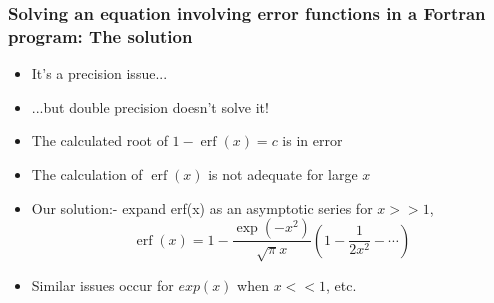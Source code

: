 \documentclass{beamer}
\DeclareMathOperator{\erf}{erf}
\begin{document}
\begin{frame}
\frametitle{Solving an equation involving error functions in a Fortran program:
The solution}
\begin{itemize}
\item It's a precision issue...
\item ...but double precision doesn't solve it!
\item The calculated root of $1-\erf(x) = c$ is in error
\item The calculation of $\erf(x)$ is not adequate for large $x$
\item Our solution:- expand erf(x) as an asymptotic series for $x >> 1$,
\[ \erf(x) = 1 - \frac{\exp(-x^2)}{\sqrt{\pi}x} \left( 1-\frac{1}{2x^2} - \cdots
\right) \]
\item Similar issues occur for $exp(x)$ when $x << 1$, etc.
\end{itemize}
\end{frame}
\end{document}
